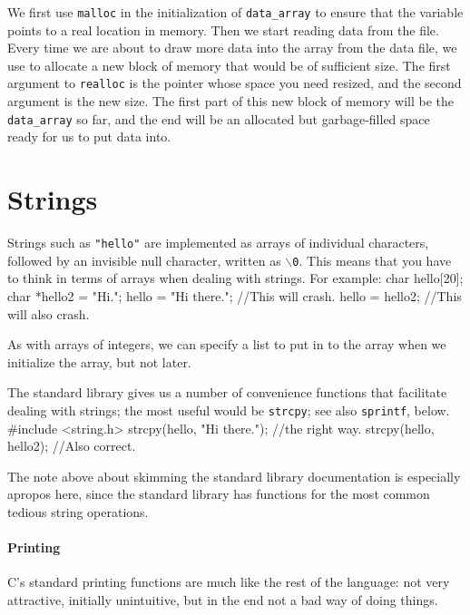 \documentclass[12pt]{article}
\makeatletter
\def\ttind#1{\index{#1@{\tt #1}}{\tt #1}}
\makeatother
\begin{document}
We first use {\tt malloc} in the initialization of {\tt data\_array}
to ensure that the variable points to a real location in memory. Then
we start reading data from the file. Every time we are about to draw
more data into the array from the data file, we use \ttind{realloc} to
allocate a new block of memory that would be of sufficient size. The first
argument to {\tt realloc} is the pointer whose space you need resized,
and the second argument is the new size.  The first part of this new
block of memory will be the {\tt data\_array} so far, and the end will
be an allocated but garbage-filled space ready for us to put data into.

\section{Strings} 

Strings such as {\tt "hello"} are implemented as arrays of individual characters, followed by an invisible
null character, written as {\tt $\backslash$0}. This means that you have to think in terms of arrays when dealing
with strings. For example:
char hello[20];
char *hello2 = "Hi.";
hello = "Hi there."; //This will crash.
hello = hello2;  //This will also crash.

As with arrays of integers, we can specify a list to put in to the array when we initialize the array, but
not later.

The standard library gives us a number of convenience functions that facilitate dealing with strings; the
most useful would be {\tt strcpy}; see also {\tt sprintf}, below.
#include <string.h>
strcpy(hello, "Hi there."); //the right way.
strcpy(hello, hello2);      //Also correct.

The note above about skimming the standard library documentation is especially apropos here, since the
standard library has functions for the most common tedious string operations.

\paragraph{Printing} 
C's standard printing functions are much like the rest of the language: not very attractive, initially
unintuitive, but in the end not a bad way of doing things. 
\end{document}
